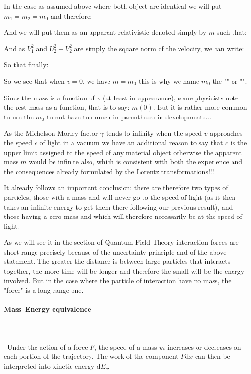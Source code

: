 	In the case as assumed above where both object are identical we will put $m_1=m_2=m_0$ and therefore:
	
	And we will put them as an apparent relativistic denoted simply by $m$ such that:
	
	And as $V_1^2$ and $U_2^2+V_2^2$ are simply the square norm of the velocity, we can write:
	
	So that finally:
	
	So we see that when $v=0$, we have $m=m_0$ this is why we name $m_0$ the "" or "".
	
	Since the mass is a function of $v$ (at least in appearance), some physicists note the rest mass as a function, that is to say: $m(0)$. But it is rather more common to use the $m_0$ to not have too much in parentheses in developments...
	
	As the Michelson-Morley factor $\gamma$ tends to infinity when the speed $v$ approaches the speed $c$ of light in a vacuum we have an additional reason to say that $c$ is the upper limit assigned to the speed of any material object otherwise the apparent mass $m$ would be infinite also, which is consistent with both the experience and the consequences already formulated by the Lorentz transformations!!!
	
	It already follows an important conclusion: there are therefore two types of particles, those with a mass and will never go to the speed of light (as it then takes an infinite energy to get them there following our previous result), and those having a zero mass and which will therefore necessarily be at the speed of light.
	
	As we will see it in the section of Quantum Field Theory interaction forces are short-range precisely because of the uncertainty principle and of the above statement. The greater the distance is between large particles that interacts together, the more time will be longer and therefore the small will be the energy involved. But in the case where the particle of interaction have no mass, the "force" is a long range one.
	
	\pagebreak
	\paragraph{Mass–Energy equivalence}\label{mass energy equivalence}\mbox{}\\\\\
	Under the action of a force $F$, the speed of a mass $m$ increases or decreases on each portion of the trajectory. The work of the component $F\mathrm{d}x$  can then be interpreted into kinetic energy $\mathrm{d}E_c$.

